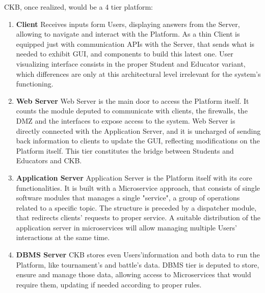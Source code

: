 CKB, once realized, would be a 4 tier platform:
\begin{enumerate}[label=$\bullet$]
    \item \textbf{Client} Receives inputs form Users, displaying answers from the Server, allowing to navigate and interact with the Platform. As a thin Client is equipped just with 
    communication APIs with the Server, that sends what is needed to exhibit GUI, and components to build this latest one. User visualizing interface consists in the proper Student and Educator 
    variant, which differences are only at this architectural level irrelevant for the system's functioning.
    \item \textbf{Web Server} Web Server is the main door to access the Platform itself. It counts the module deputed to communicate with clients, the firewalls, the DMZ and the interfaces to 
    expose access to the system. Web Server is directly connected with the Application Server, and it is uncharged of sending back information to clients to update the GUI, reflecting 
    modifications on the Platform itself. This tier constitutes the bridge between Students and Educators and CKB.
    \item \textbf{Application Server} Application Server is the Platform itself with its core functionalities. It is built with a Microservice approach, that consists of single software modules 
    that manages a single "service", a group of operations related to a specific topic. The structure is preceded by a dispatcher module, that redirects clients' requests to proper service. 
    A suitable distribution of the application server in microservices will allow managing multiple Users' interactions at the same time.
    \item \textbf{DBMS Server} CKB stores even Users'information and both data to run the Platform, like tournament's and battle's data. DBMS tier is deputed to store, ensure and manage those data, 
    allowing access to Microservices that would require them, updating if needed according to proper rules. 
\end{enumerate}



